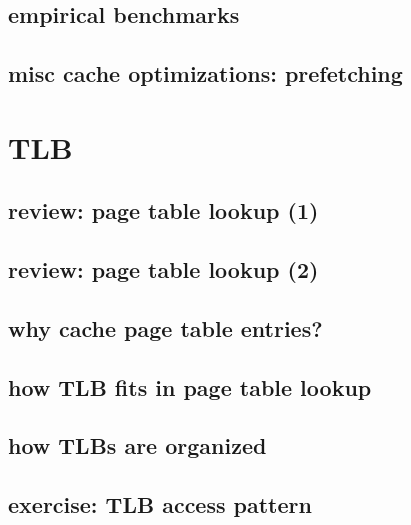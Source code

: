 \subsection{empirical benchmarks}


\subsection{misc cache optimizations: prefetching}


\section{TLB}

\subsection{review: page table lookup (1)}


\subsection{review: page table lookup (2)}

\subsection{why cache page table entries?}


\subsection{how TLB fits in page table lookup}


\subsection{how TLBs are organized}

\subsection{exercise: TLB access pattern}






